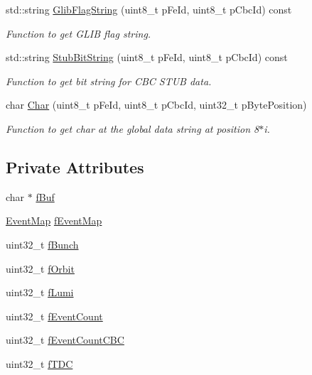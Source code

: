 \begin{DoxyCompactItemize}
std\-::string \hyperlink{class_ph2___hw_interface_1_1_event_a8b6a50a409927366a830084f11885882}{Glib\-Flag\-String} (uint8\-\_\-t p\-Fe\-Id, uint8\-\_\-t p\-Cbc\-Id) const 
\begin{DoxyCompactList}\small\item\em Function to get G\-L\-I\-B flag string. \end{DoxyCompactList}\item 
std\-::string \hyperlink{class_ph2___hw_interface_1_1_event_abc647a9563bd796f8785590a2b5b525b}{Stub\-Bit\-String} (uint8\-\_\-t p\-Fe\-Id, uint8\-\_\-t p\-Cbc\-Id) const 
\begin{DoxyCompactList}\small\item\em Function to get bit string for C\-B\-C S\-T\-U\-B data. \end{DoxyCompactList}\item 
char \hyperlink{class_ph2___hw_interface_1_1_event_a348abea85bdfdfc8c0b88cda907dbea8}{Char} (uint8\-\_\-t p\-Fe\-Id, uint8\-\_\-t p\-Cbc\-Id, uint32\-\_\-t p\-Byte\-Position)
\begin{DoxyCompactList}\small\item\em Function to get char at the global data string at position 8$\ast$i. \end{DoxyCompactList}\end{DoxyCompactItemize}
\subsection*{Private Attributes}
\begin{DoxyCompactItemize}
\item 
char $\ast$ \hyperlink{class_ph2___hw_interface_1_1_event_ab396cf1480f11b535d0e464aa6f9f046}{f\-Buf}
\item 
\hyperlink{namespace_ph2___hw_interface_acf9f41d647e7a3ad9bae233b04b9e3bc}{Event\-Map} \hyperlink{class_ph2___hw_interface_1_1_event_ace9844f1fc14895f880ed111c705d392}{f\-Event\-Map}
\item 
uint32\-\_\-t \hyperlink{class_ph2___hw_interface_1_1_event_ae5b69f2e0a9c9c947f7a37b7dcf380dc}{f\-Bunch}
\item 
uint32\-\_\-t \hyperlink{class_ph2___hw_interface_1_1_event_a6aa6c402d2b16e735fbb4b7518c2666e}{f\-Orbit}
\item 
uint32\-\_\-t \hyperlink{class_ph2___hw_interface_1_1_event_a78afd0886560acf70ee6b982c5690e0a}{f\-Lumi}
\item 
uint32\-\_\-t \hyperlink{class_ph2___hw_interface_1_1_event_add8f3a445ae11e54b47af7690074a4ce}{f\-Event\-Count}
\item 
uint32\-\_\-t \hyperlink{class_ph2___hw_interface_1_1_event_ac61b0e2c53e5d4228d43132f470dfdac}{f\-Event\-Count\-C\-B\-C}
\item 
uint32\-\_\-t \hyperlink{class_ph2___hw_interface_1_1_event_ab91638311238d12f1cd258556c8d1d80}{f\-T\-D\-C}
\end{DoxyCompactItemize}


